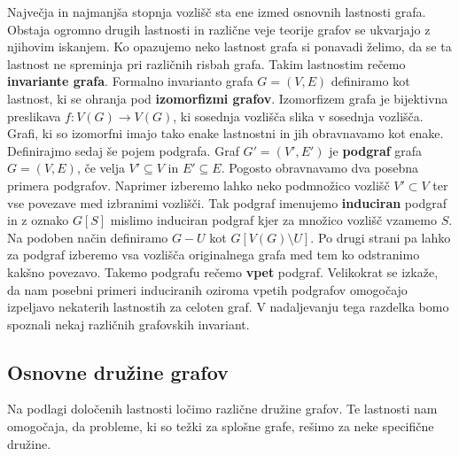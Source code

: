 \documentclass[12pt,a4paper,twoside]{article}
\theoremstyle{definition} %
\theoremstyle{plain} %
\numberwithin{equation}{section}  %
\begin{document}
Največja in najmanjša stopnja vozlišč sta ene izmed osnovnih lastnosti grafa. Obstaja ogromno drugih lastnosti in različne veje teorije grafov se ukvarjajo z njihovim iskanjem. Ko opazujemo neko lastnost grafa si ponavadi želimo, da se ta lastnost ne spreminja pri različnih risbah grafa. Takim lastnostim rečemo \textbf{invariante grafa}.  Formalno invarianto grafa $G=(V,E)$ definiramo kot lastnost, ki se ohranja pod \textbf{izomorfizmi grafov}. Izomorfizem grafa je bijektivna preslikava $f: V(G) \rightarrow V(G)$, ki sosednja vozlišča slika v sosednja vozlišča. Grafi, ki so izomorfni imajo tako enake lastnostni in jih obravnavamo kot enake. Definirajmo sedaj še pojem podgrafa. Graf $G' = (V', E')$ je \textbf{podgraf} grafa $G = (V, E)$, če velja $ V' \subseteq V$ in $E' \subseteq E$. Pogosto obravnavamo dva posebna primera podgrafov. Naprimer izberemo lahko neko podmnožico vozlišč $V' \subset V$ ter vse povezave med izbranimi vozlišči. Tak podgraf imenujemo \textbf{induciran} podgraf in z oznako $G[S]$ mislimo induciran podgraf kjer za množico vozlišč vzamemo $S$. Na podoben način definiramo $G - U$ kot $G[V(G) \setminus U]$. Po drugi strani pa lahko za podgraf izberemo vsa vozlišča originalnega grafa med tem ko odstranimo kakšno povezavo. Takemo podgrafu rečemo \textbf{vpet} podgraf. Velikokrat se izkaže, da nam posebni primeri induciranih oziroma vpetih podgrafov omogočajo izpeljavo nekaterih lastnostih za celoten graf. V nadaljevanju tega razdelka bomo spoznali nekaj različnih grafovskih invariant.

\subsection{Osnovne družine grafov}
Na podlagi določenih lastnosti ločimo različne družine grafov. Te lastnosti nam omogočaja, da probleme, ki so težki za splošne grafe, rešimo za neke specifične družine.
\end{document}
